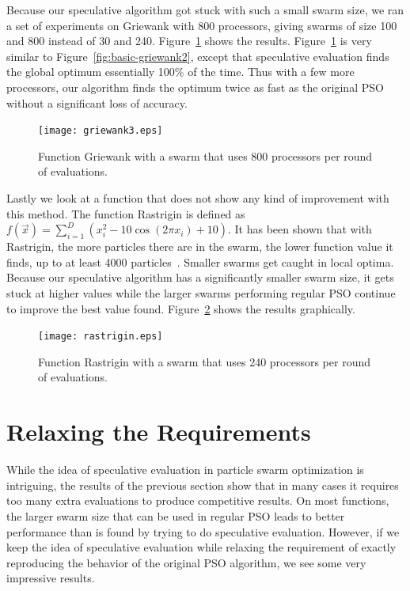 \documentclass[journal,letterpaper]{IEEEtran}
\newcommand{\fig}[1]{Figure~\ref{fig:#1}}
\begin{document}
Because our speculative algorithm got stuck with such a small swarm size, we
ran a set of experiments on Griewank with 800 processors, giving swarms of size
100 and 800 instead of 30 and 240.  \fig{basic-griewank3} shows the results.
\fig{basic-griewank3} is very similar to \fig{basic-griewank2}, except that
speculative evaluation finds the global optimum essentially 100\% of the time.
Thus with a few more processors, our algorithm finds the optimum twice as fast
as the original PSO without a significant loss of accuracy.

\begin{figure}
  \centering
  \texttt{[image: griewank3.eps]}
  \caption{Function Griewank with a swarm that uses 800 processors per round of
  evaluations.}
  \label{fig:basic-griewank3}
\end{figure}

Lastly we look at a function that does not show any kind of improvement with
this method.  The function Rastrigin is defined as $f(\Vec{x}) = \sum_{i=1}^D
\left(x_i^2 - 10\cos\left(2\pi x_i\right) + 10\right)$.  It has been shown that
with Rastrigin, the more particles there are in the swarm, the lower function
value it finds, up to at least 4000 particles~\cite{mcnabb-cec09}.  Smaller
swarms get caught in local optima.  Because our speculative algorithm has a
significantly smaller swarm size, it gets stuck at higher values while the
larger swarms performing regular PSO continue to improve the best value found.
\fig{rastrigin} shows the results graphically.

\begin{figure}
  \centering
  \texttt{[image: rastrigin.eps]}
  \caption{Function Rastrigin with a swarm that uses 240 processors per round
  of evaluations.}
  \label{fig:rastrigin}
\end{figure}

\section{Relaxing the Requirements}
\label{sec:relax}

While the idea of speculative evaluation in particle swarm optimization is
intriguing, the results of the previous section show that in many cases it
requires too many extra evaluations to produce competitive results.  On most
functions, the larger swarm size that can be used in regular PSO leads to
better performance than is found by trying to do speculative evaluation.
However, if we keep the idea of speculative evaluation while relaxing the
requirement of exactly reproducing the behavior of the original PSO algorithm,
we see some very impressive results.
\end{document}
